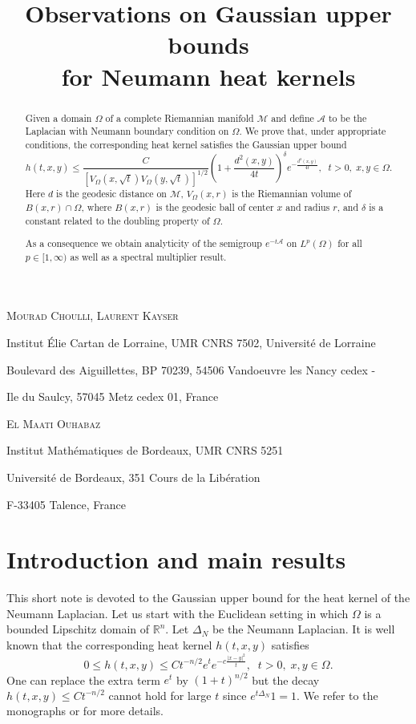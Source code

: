 \documentclass[10pt]{amsart}
\title[Neumann heat kernels] {Observations on Gaussian upper bounds\\  for Neumann heat kernels}
\author[Mourad Choulli, Laurent Kayser and El Maati Ouhabaz]{}
\theoremstyle{definition}
\begin{document}
\maketitle

\centerline{\scshape Mourad Choulli, Laurent Kayser}
\medskip
{\footnotesize
\centerline{Institut \'Elie Cartan de Lorraine, UMR CNRS 7502, Universit\'e de Lorraine}
   \centerline{Boulevard des Aiguillettes, BP 70239, 54506 Vandoeuvre les Nancy cedex -}
   \centerline{ Ile du Saulcy, 57045 Metz cedex 01, France}
} 

\medskip

\centerline{\scshape El Maati Ouhabaz}
\medskip
{\footnotesize
 \centerline{Institut Math\'ematiques de Bordeaux, UMR CNRS 5251}
   \centerline{Universit\'e de Bordeaux, 351 Cours de la Lib\'eration}
   \centerline{F-33405 Talence, France}
}

\bigskip

\begin{abstract}
Given a domain $\Omega$ of a complete Riemannian manifold $\mathcal{M}$ and define $\mathcal{A}$ to be the Laplacian with Neumann boundary condition on $\Omega$. We prove that, under appropriate conditions, the corresponding heat kernel satisfies the  Gaussian upper bound
 \[
h(t,x,y)\leq \frac{C}{\left[V_\Omega(x,\sqrt{t})V_\Omega (y,\sqrt{t})\right]^{1/2}}\left( 1+\frac{d^2(x,y)}{4t}\right)^{\delta}e^{-\frac{d^2(x,y)}{4t}},\;\; t>0,\; x,y\in \Omega .
\]
Here $d$ is the geodesic distance on $\mathcal{M}$, $V_\Omega (x,r)$ is the Riemannian volume of $B(x,r)\cap \Omega$, where $B(x,r)$ is the geodesic ball of center $x$ and radius $r$, and $\delta$ is a constant related to the doubling property of $\Omega$.

\smallskip
As a consequence we obtain  analyticity of the semigroup $e^{-t {\mathcal A}}$ on $L^p(\Omega)$ for all $p \in [1, \infty)$ as well as a spectral multiplier result.
\end{abstract}

\section{Introduction and main results}\label{section1}

This short note is devoted to the Gaussian upper bound for  the heat kernel of the Neumann Laplacian.  Let us start with the Euclidean setting in which $\Omega$ is a bounded Lipschitz domain of $\mathbb{R}^n$. Let $\Delta_N$ be the  Neumann Laplacian. It is well known  that the corresponding heat kernel  $h(t,x,y)$ satisfies
\begin{equation}\label{gau1}
0 \le h(t,x,y) \le C t^{-n/2} e^{t} e^{-c\frac{ |x-y|^2}{t}} ,\;\;  t > 0,\;  x, y \in \Omega.
\end{equation}
 One can replace the extra term $e^t$ by $(1 + t)^{n/2}$ but the decay $h(t,x,y) \le Ct^{-n/2}$ cannot hold for large $t$ 
 since $e^{t \Delta_N} 1 = 1$. We refer to the monographs \cite{Da} or \cite{Ou} for more details.
 
\end{document}
